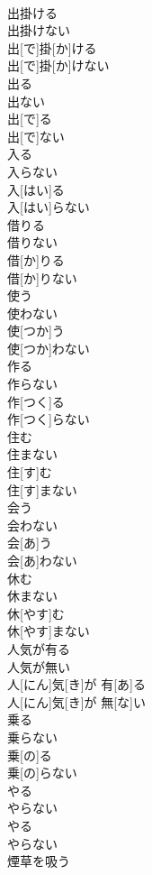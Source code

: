 \documentclass[8pt]{extreport}
\begin{document}
\begin{CJK}{UTF8}{min}
\\	出掛ける 
\\	出掛けない	
\\	出[で]掛[か]ける 
\\	出[で]掛[か]けない
\\	出る 
\\	出ない	
\\	出[で]る 
\\	出[で]ない
\\	入る 
\\	入らない	
\\	入[はい]る 
\\	入[はい]らない
\\	借りる 
\\	借りない	
\\	借[か]りる 
\\	借[か]りない
\\	使う 
\\	使わない	
\\	使[つか]う 
\\	使[つか]わない
\\	作る 
\\	作らない	
\\	作[つく]る 
\\	作[つく]らない
\\	住む 
\\	住まない	
\\	住[す]む 
\\	住[す]まない
\\	会う 
\\	会わない	
\\	会[あ]う 
\\	会[あ]わない
\\	休む 
\\	休まない	
\\	休[やす]む 
\\	休[やす]まない
\\	人気が有る 
\\	人気が無い	
\\	人[にん]気[き]が 有[あ]る 
\\	人[にん]気[き]が 無[な]い
\\	乗る 
\\	乗らない	
\\	乗[の]る 
\\	乗[の]らない
\\	やる 
\\	やらない	
\\	やる 
\\	やらない
\\	煙草を吸う 

\end{CJK}
\end{document}

